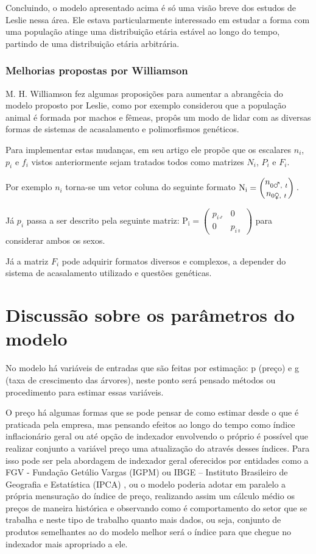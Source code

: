 \documentclass[a4paper, 12pt]{article}
\begin{document}
Concluindo, o modelo apresentado acima é só uma visão breve dos estudos de Leslie nessa área. Ele estava particularmente interessado em estudar a forma com uma população atinge uma distribuição etária estável ao longo do tempo, partindo de uma distribuição etária arbitrária.

\subsubsection{Melhorias propostas por Williamson}

M. H. Williamson fez algumas proposições \citep{williamson_1959} para aumentar a abrangêcia do modelo proposto por Leslie, como por exemplo considerou que a população animal é formada por machos e fêmeas, propôs um modo de lidar com as diversas formas de sistemas de acasalamento e polimorfismos genéticos. 

Para implementar estas mudanças, em seu artigo ele propõe que os escalares $n_i$, $p_i$ e $f_i$ vistos anteriormente sejam tratados todos como matrizes $N_i$, $P_i$ e $F_i$.

Por exemplo $n_i$ torna-se um vetor coluna do seguinte formato $\mathrm{N_i}=\begin{pmatrix}
n_{0\male{,}\ t}\\
n_{0\female{,}\ t}
\end{pmatrix}\\$. 

Já $p_i$ passa a ser descrito pela seguinte matriz: $\mathrm{P_i}=\begin{pmatrix}
p_{i\male}&0\\
0&p_{i\female}
\end{pmatrix}$ para considerar ambos os sexos.

Já a matriz $F_i$ pode adquirir formatos diversos e complexos, a depender do sistema de acasalamento utilizado e questões genéticas.

\section{Discussão sobre os parâmetros do modelo}
No modelo há variáveis de entradas que são feitas por estimação: p (preço) e g (taxa de crescimento das árvores), neste ponto será pensado métodos ou procedimento para estimar essas variáveis.

O preço há algumas formas que se pode pensar de como estimar desde o que é praticada pela empresa, mas pensando efeitos ao longo do tempo como índice inflacionário geral ou até opção de indexador envolvendo o próprio é possível que realizar conjunto a variável preço uma atualização do através desses índices. Para isso pode ser pela abordagem de indexador geral oferecidos por entidades como a FGV - Fundação Getúlio Vargas (IGPM) ou IBGE – Instituto Brasileiro de Geografia e Estatística (IPCA) , ou o modelo poderia adotar em paralelo a própria mensuração do índice de preço, realizando assim um cálculo médio os preços de maneira histórica e observando como é comportamento do setor que se trabalha e neste tipo de trabalho quanto mais dados, ou seja, conjunto de produtos semelhantes ao do modelo melhor será o índice para que chegue no indexador mais apropriado a ele.
\end{document}

